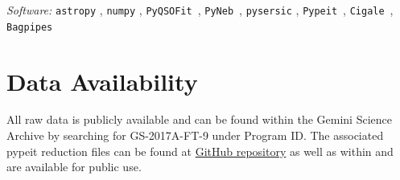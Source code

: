 \documentclass[twocolumn,tight,times,linenumbers]{aastex631}
\newcommand{\pypeit}{\texttt{Pypeit}}
\newcommand{\pyqsofit}{\texttt{PyQSOFit}}
\newcommand{\pyneb}{\texttt{PyNeb}}
\newcommand{\cigale}{\texttt{Cigale}}
\newcommand{\bagpipes}{\texttt{Bagpipes}}
\begin{document}
		\textit{Software:} \texttt{astropy} \citep{astropy:2013,astropy:2018,astropy:2022}, \texttt{numpy} \citep{harris2020array}, \pyqsofit~\citep{Guo2018,Shen2019}, \pyneb~\citep{Luridiana2015}, \texttt{pysersic} \citep{Pasha2023}, \pypeit~\citep{Prochaska2020, Prochaska_zenodo}, \cigale~\citep{Boquien2019,Yang2022}, \bagpipes~\citep{Carnall2018}
		
		
		
		\section*{Data Availability}
		
		All raw data is publicly available and can be found within the Gemini Science Archive by searching for GS-2017A-FT-9 under Program ID. The associated pypeit reduction files can be found at \href{https://github.com/akhostov/EELG1002}{GitHub repository} as well as within  and are available for public use.
		
		
\end{document}
